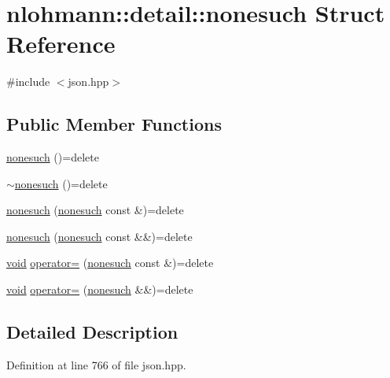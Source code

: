 \hypertarget{structnlohmann_1_1detail_1_1nonesuch}{}\section{nlohmann\+::detail\+::nonesuch Struct Reference}
\label{structnlohmann_1_1detail_1_1nonesuch}


{\ttfamily \#include $<$json.\+hpp$>$}

\subsection*{Public Member Functions}
\begin{DoxyCompactItemize}
\item 
\mbox{\hyperlink{structnlohmann_1_1detail_1_1nonesuch_a6fe87da966856c6cb06617940d90f010}{nonesuch}} ()=delete
\item 
\mbox{\hyperlink{structnlohmann_1_1detail_1_1nonesuch_a7b1119845860e548b67f1644a2084373}{$\sim$nonesuch}} ()=delete
\item 
\mbox{\hyperlink{structnlohmann_1_1detail_1_1nonesuch_a563462ef2d05fe60cdf1dc7f567dc276}{nonesuch}} (\mbox{\hyperlink{structnlohmann_1_1detail_1_1nonesuch}{nonesuch}} const \&)=delete
\item 
\mbox{\hyperlink{structnlohmann_1_1detail_1_1nonesuch_ad7719f7d2a00263be8b8d123870217d8}{nonesuch}} (\mbox{\hyperlink{structnlohmann_1_1detail_1_1nonesuch}{nonesuch}} const \&\&)=delete
\item 
\mbox{\hyperlink{namespacenlohmann_1_1detail_a59fca69799f6b9e366710cb9043aa77d}{void}} \mbox{\hyperlink{structnlohmann_1_1detail_1_1nonesuch_add6ef84c52a851e391cef514c85f2ffe}{operator=}} (\mbox{\hyperlink{structnlohmann_1_1detail_1_1nonesuch}{nonesuch}} const \&)=delete
\item 
\mbox{\hyperlink{namespacenlohmann_1_1detail_a59fca69799f6b9e366710cb9043aa77d}{void}} \mbox{\hyperlink{structnlohmann_1_1detail_1_1nonesuch_a78ca022a1b4defe4f7ba662843602231}{operator=}} (\mbox{\hyperlink{structnlohmann_1_1detail_1_1nonesuch}{nonesuch}} \&\&)=delete
\end{DoxyCompactItemize}


\subsection{Detailed Description}


Definition at line 766 of file json.\+hpp.



